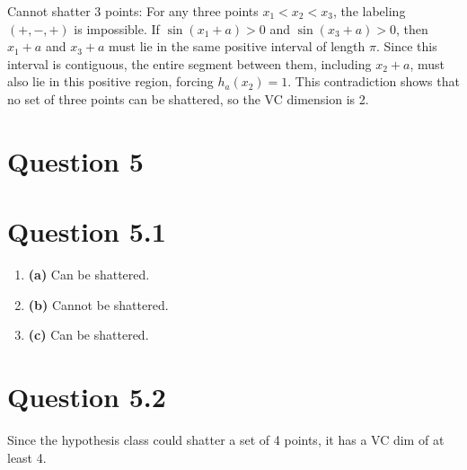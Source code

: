 \documentclass[a4paper]{article}
\begin{document}
\begin{enumerate}
    Cannot shatter 3 points: For any three points $x_1 < x_2 < x_3$, the labeling $(+,-,+)$ is impossible. If $\sin(x_1 + a) > 0$ and $\sin(x_3 + a) > 0$, then $x_1 + a$ and $x_3 + a$ must lie in the same positive interval of length $\pi$. Since this interval is contiguous, the entire segment between them, including $x_2 + a$, must also lie in this positive region, forcing $h_a(x_2) = 1$. This contradiction shows that no set of three points can be shattered, so the VC dimension is 2.
\end{enumerate}



\newpage
\section*{Question 5}
\section*{Question 5.1}
\begin{enumerate}
    \item \textbf{(a)} Can be shattered.
    \item \textbf{(b)} Cannot be shattered.
    \item \textbf{(c)} Can be shattered.
\end{enumerate}

\section*{Question 5.2}
Since the hypothesis class could shatter a set of 4 points, it has a VC dim of at least 4.
\end{document}
